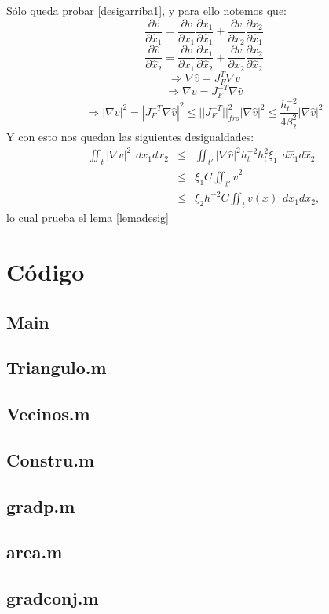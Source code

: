 \documentclass[12pt,spanish,oneside]{book}
\theoremstyle{plain}
\numberwithin{equation}{chapter}
\theoremstyle{definition}
\theoremstyle{remark}
\newcommand{\parc}[2]{\frac{\partial #1}{\partial #2}}
\newcommand{\dxhat}{\hspace{5pt} d\hat{x}_1d\hat{x}_2}
\newcommand{\dxt}{\hspace{5pt} dx_1dx_2}
\begin{document}
Sólo queda probar \ref{desigarriba1}, y para ello notemos que: 
\[\parc{\hat{v}}{\hat{x}_1}=\parc{v}{x_1}\parc{x_1}{\hat{x}_1}+\parc{v}{x_2}\parc{x_2}{\hat{x}_1}\]
\[\parc{\hat{v}}{\hat{x}_2}=\parc{v}{x_1}\parc{x_1}{\hat{x}_2}+\parc{v}{x_2}\parc{x_2}{\hat{x}_2}\]
\[\Rightarrow \nabla\hat{v}=J_F^T\nabla v\]
\[\Rightarrow \nabla v=J_F^{-T}\nabla\hat{v}\]
\[\Rightarrow |\nabla v|^2=|J_F^{-T}\nabla\hat{v}|^2\leq||J_F^{-T}||_{fro}^2|\nabla \hat{v}|^2\leq \frac{h_t^{-2}}{4\beta_2^2}|\nabla \hat{v}|^2\]
Y con esto nos quedan las siguientes desigualdades: 
\begin{eqnarray*}
 \iint_t|\nabla v|^2\dxt &\leq& \iint_{t'}|\nabla \hat{v}|^2h_t^{-2}h_t^2\xi_1\dxhat\\
&\leq&\xi_1C \iint_{t'}\hat{v}^2\\
&\leq& \xi_2h^{-2}C\iint_t v(x)\dxt,
\end{eqnarray*}
lo cual prueba el lema \ref{lemadesig}
\chapter{Código}
\section{Main}

\section{Triangulo.m}

\section{Vecinos.m}

\section{Constru.m}

\section{gradp.m}

\section{area.m}

\section{gradconj.m}

\backmatter


\end{document}
